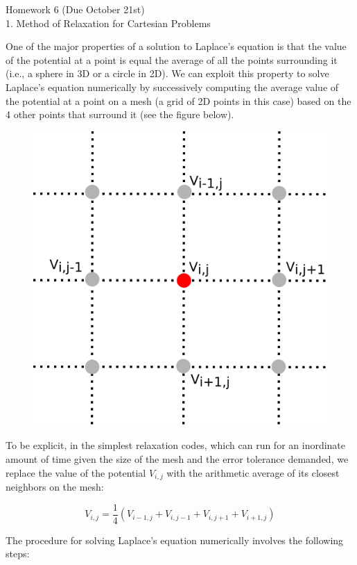 \documentclass[11pt]{article}
\begin{document}
{\LARGE Homework 6 (Due October
21st)}\label{homework-6-due-october-21st}\\

{\Large 1. Method of Relaxation for Cartesian
Problems}\label{method-of-relaxation-for-cartesian-problems}

One of the major properties of a solution to Laplace's equation is that
the value of the potential at a point is equal the average of all the
points surrounding it (i.e., a sphere in 3D or a circle in 2D). We can
exploit this property to solve Laplace's equation numerically by
successively computing the average value of the potential at a point on
a mesh (a grid of 2D points in this case) based on the 4 other points
that surround it (see the figure below).

\begin{figure}[htbp]
\centering
\includegraphics[width=0.5\linewidth]{./images/hw6/mesh.png}
\end{figure}

To be explicit, in the simplest relaxation codes, which can run for an
inordinate amount of time given the size of the mesh and the error
tolerance demanded, we replace the value of the potential \(V_{i,j}\)
with the arithmetic average of its closest neighbors on the mesh:

\[V_{i,j} = \dfrac{1}{4}\left(V_{i-1,j} + V_{i,j-1} + V_{i,j+1} + V_{i+1,j}  \right)\]

The procedure for solving Laplace's equation numerically involves the
following steps:
\end{document}
